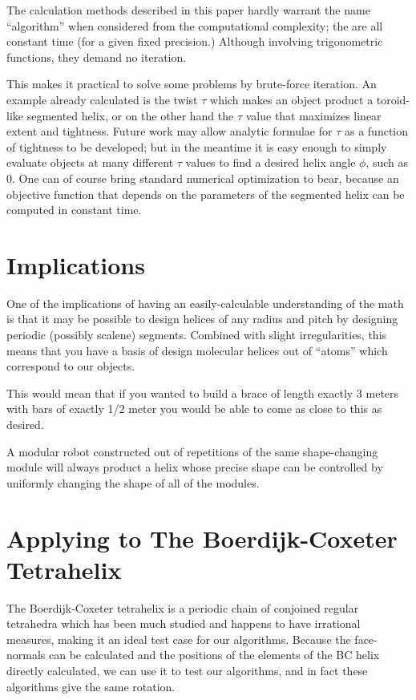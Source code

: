 \documentclass[11pt]{article}
\begin{document}
{The calculation methods described in this paper hardly warrant the name ``algorithm'' when considered from the computational complexity;
the are all constant time (for a given fixed precision.)
Although involving trigonometric functions, they demand no iteration.

This makes it practical to solve some problems by brute-force iteration.
An example already calculated is the twist $\tau$ which makes
an object product a toroid-like segmented helix, or on the other hand
the $\tau$ value that maximizes linear extent and tightness.
Future work may allow analytic formulae for $\tau$ as a function of
tightness to be developed; but in the meantime it is easy enough
to simply evaluate objects at many different $\tau$ values to find a
desired helix angle $\phi$, such as $0$. One can of course bring
standard numerical optimization to bear, because an objective function
that depends on the parameters of the segmented helix can
be computed in constant time.

\section{Implications}

One of the implications of having an easily-calculable understanding of the math
is that it may be possible to design helices
of any radius and pitch by designing periodic (possibly scalene) segments. Combined with slight
irregularities, this means that you have a basis of design molecular helices
out of ``atoms'' which correspond to our objects.

This would mean that if you wanted to build a brace of length exactly 3 meters
with bars of exactly 1/2 meter you would be able to come as close to this
as desired.

A modular robot constructed out of repetitions of the same shape-changing module will always product a helix
whose precise shape can be controlled by uniformly changing the shape of all of the modules.

\section{Applying to The Boerdijk-Coxeter Tetrahelix}

The Boerdijk-Coxeter tetrahelix is a periodic chain of conjoined regular tetrahedra
which has been much studied\cite{coxeter1985simplicial,sadler2013periodic,fuller1982synergetics,read2018transforming}
and happens to have irrational measures, making it an ideal
test case for our algorithms. Because the face-normals can be calculated and the
positions of the elements of the BC helix directly calculated, we can use
it to test our algorithms, and in fact these algorithms give the same rotation.

}
\end{document}
